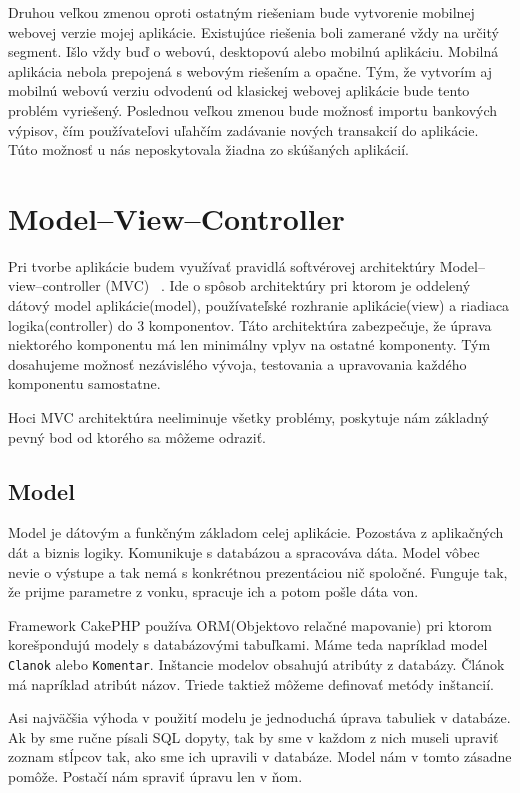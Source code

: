\documentclass[12pt,oneside]{book}
\begin{document}
Druhou veľkou zmenou oproti ostatným riešeniam bude vytvorenie mobilnej webovej verzie mojej aplikácie. Existujúce riešenia boli zamerané vždy na určitý segment. Išlo vždy buď o webovú, desktopovú alebo mobilnú aplikáciu. Mobilná aplikácia nebola prepojená s webovým riešením a opačne. Tým, že vytvorím aj mobilnú webovú verziu odvodenú od klasickej webovej aplikácie bude tento problém vyriešený. Poslednou veľkou zmenou bude možnosť importu bankových výpisov, čím používateľovi uľahčím zadávanie nových transakcií do aplikácie. Túto možnosť u nás neposkytovala žiadna zo skúšaných aplikácií.

\section{Model–View–Controller}
Pri tvorbe aplikácie budem využívať pravidlá softvérovej architektúry Model–view–controller (MVC) \cite{MVCdevbook}\ . Ide o spôsob architektúry pri ktorom je oddelený dátový model aplikácie(model), používateľské rozhranie aplikácie(view) a riadiaca logika(controller) do 3 komponentov. Táto architektúra zabezpečuje, že úprava niektorého komponentu má len minimálny vplyv na ostatné komponenty. Tým dosahujeme možnosť nezávislého vývoja, testovania a upravovania každého komponentu samostatne.

Hoci MVC architektúra neeliminuje všetky problémy, poskytuje nám základný pevný bod od ktorého sa môžeme odraziť.

\subsection{Model}
Model je dátovým a funkčným základom celej aplikácie. Pozostáva z aplikačných dát a biznis logiky. Komunikuje s databázou a spracováva dáta. Model vôbec nevie o výstupe a tak nemá s konkrétnou prezentáciou nič spoločné. Funguje tak, že prijme parametre z vonku, spracuje ich a potom pošle dáta von. 

Framework CakePHP používa ORM(Objektovo relačné mapovanie) pri ktorom korešpondujú modely s databázovými tabuľkami. Máme teda napríklad model \texttt{Clanok} alebo \texttt{Komentar}. Inštancie modelov obsahujú atribúty z databázy. Článok má napríklad atribút názov. Triede taktiež môžeme definovať metódy inštancií.

Asi najväčšia výhoda v použití modelu je jednoduchá úprava tabuliek v databáze.  Ak by sme ručne písali SQL dopyty, tak by sme v každom z nich museli upraviť zoznam stĺpcov tak, ako sme ich upravili v databáze. Model nám v tomto zásadne pomôže. Postačí nám spraviť úpravu len v ňom.
\end{document}

